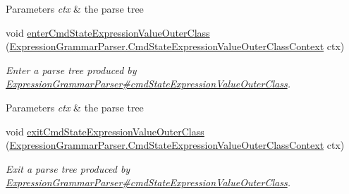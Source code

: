 \begin{DoxyCompactItemize}
\begin{DoxyCompactList}
\begin{DoxyParams}{Parameters}
{\em ctx} & the parse tree\\
\hline
\end{DoxyParams}
 \end{DoxyCompactList}\item 
void \hyperlink{classgov_1_1nasa_1_1jpf_1_1inspector_1_1server_1_1expression_1_1parser_1_1_expression_grammar_base_listener_a5c79f05f5a16a4f8f1e3686d296fa7ec}{enter\+Cmd\+State\+Expression\+Value\+Outer\+Class} (\hyperlink{classgov_1_1nasa_1_1jpf_1_1inspector_1_1server_1_1expression_1_1parser_1_1_expression_grammar_paa97aac802c11881ff9166c765f4fc61a}{Expression\+Grammar\+Parser.\+Cmd\+State\+Expression\+Value\+Outer\+Class\+Context} ctx)
\begin{DoxyCompactList}\small\item\em Enter a parse tree produced by \hyperlink{classgov_1_1nasa_1_1jpf_1_1inspector_1_1server_1_1expression_1_1parser_1_1_expression_grammar_parser_a3cb4602fb37c47251dc62b7e1d7c9f0c}{Expression\+Grammar\+Parser\#cmd\+State\+Expression\+Value\+Outer\+Class}.


\begin{DoxyParams}{Parameters}
{\em ctx} & the parse tree\\
\hline
\end{DoxyParams}
 \end{DoxyCompactList}\item 
void \hyperlink{classgov_1_1nasa_1_1jpf_1_1inspector_1_1server_1_1expression_1_1parser_1_1_expression_grammar_base_listener_a0a5d94b5a15b70185d3dd9df4c56b821}{exit\+Cmd\+State\+Expression\+Value\+Outer\+Class} (\hyperlink{classgov_1_1nasa_1_1jpf_1_1inspector_1_1server_1_1expression_1_1parser_1_1_expression_grammar_paa97aac802c11881ff9166c765f4fc61a}{Expression\+Grammar\+Parser.\+Cmd\+State\+Expression\+Value\+Outer\+Class\+Context} ctx)
\begin{DoxyCompactList}\small\item\em Exit a parse tree produced by \hyperlink{classgov_1_1nasa_1_1jpf_1_1inspector_1_1server_1_1expression_1_1parser_1_1_expression_grammar_parser_a3cb4602fb37c47251dc62b7e1d7c9f0c}{Expression\+Grammar\+Parser\#cmd\+State\+Expression\+Value\+Outer\+Class}.



\end{DoxyCompactList}
\end{DoxyCompactItemize}

